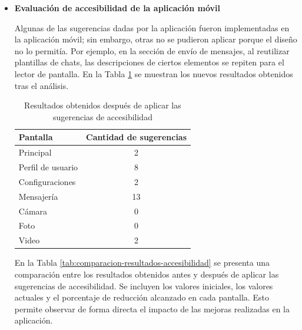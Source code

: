 \documentclass[lettersize,journal]{IEEEtran}
\begin{document}
\begin{itemize}
	Es importante tener en cuenta que en la pantalla de mensajería se presenta la mayor cantidad de sugerencias, ya que la aplicación utiliza diseños repetitivos basados en una misma plantilla para mostrar los mensajes. Esto provoca que la herramienta interprete la existencia de elementos duplicados al realizar la lectura de la interfaz.
	
	\item \textbf{Evaluación de accesibilidad de la aplicación móvil} 
	
	Algunas de las sugerencias dadas por la aplicación fueron implementadas en la aplicación móvil; sin embargo, otras no se pudieron aplicar porque el diseño no lo permitía. Por ejemplo, en la sección de envío de mensajes, al reutilizar plantillas de chats, las descripciones de ciertos elementos se repiten para el lector de pantalla. En la Tabla \ref{tab:resultados-accesibilidad} se muestran los nuevos resultados obtenidos tras el análisis.
	
	\begin{table}[ht]
		\centering
		\caption{Resultados obtenidos después de aplicar las sugerencias de accesibilidad}
		\label{tab:resultados-accesibilidad}
		\small
		\begin{tabular}{lc}
			\toprule
			\textbf{Pantalla} & \textbf{Cantidad de sugerencias} \\
			\midrule
			Principal & 2 \\
			Perfil de usuario & 8 \\
			Configuraciones & 2 \\
			Mensajería & 13 \\
			Cámara & 0 \\
			Foto & 0 \\
			Video & 2 \\
			\bottomrule
		\end{tabular}
	\end{table}
	
	En la Tabla \ref{tab:comparacion-resultados-accesibilidad} se presenta una comparación entre los resultados obtenidos antes y después de aplicar las sugerencias de accesibilidad. Se incluyen los valores iniciales, los valores actuales y el porcentaje de reducción alcanzado en cada pantalla. Esto permite observar de forma directa el impacto de las mejoras realizadas en la aplicación.
	

\end{itemize}
\end{document}
